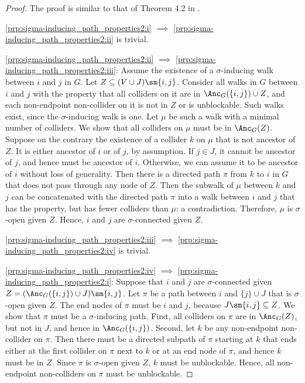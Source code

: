 \begin{proof}
  The proof is similar to that of Theorem 4.2 in \cite{RichardsonSpirtes02}.

  \ref{prp:sigma-inducing_path_properties2:i} $\implies$ \ref{prp:sigma-inducing_path_properties2:ii} is trivial.

  \ref{prp:sigma-inducing_path_properties2:ii} $\implies$ \ref{prp:sigma-inducing_path_properties2:iii}: Assume the existence of a $\sigma$-inducing walk between $i$ and $j$ in $G$. 
  Let $Z \subseteq (V \cup J) \sm\{i,j\}$. 
  Consider all walks in $G$ between $i$ and $j$ with the property that all colliders on it are in $\Anc_{G}({\{i,j\}) \cup Z}$, and each non-endpoint non-collider on it is not in $Z$ or is unblockable.
  Such walks exist, since the $\sigma$-inducing walk is one. 
  Let $\mu$ be such a walk with a minimal number of colliders.
  We show that all colliders on $\mu$ must be in $\Anc_{G}(Z)$. 
  Suppose on the contrary the existence of a collider $k$ on $\mu$ that is not ancestor of $Z$. 
  It is either ancestor of $i$ or of $j$, by assumption.
  If $j \in J$, it cannot be ancestor of $j$, and hence must be ancestor of $i$.
  Otherwise, we can assume it to be ancestor of $i$ without loss of generality.
  Then there is a directed path $\pi$ from $k$ to $i$ in $G$ that does not pass through any node of $Z$. 
  Then the subwalk of $\mu$ between $k$ and $j$ can be concatenated with the directed path $\pi$
  into a walk between $i$ and $j$ that has the property, but has fewer colliders than $\mu$: a contradiction. 
  Therefore, $\mu$ is $\sigma$-open given $Z$.
  Hence, $i$ and $j$ are $\sigma$-connected given $Z$.

  \ref{prp:sigma-inducing_path_properties2:iii} $\implies$ \ref{prp:sigma-inducing_path_properties2:iv} is trivial.

  \ref{prp:sigma-inducing_path_properties2:iv} $\implies$ \ref{prp:sigma-inducing_path_properties2:i}:
  Suppose that %
  $i$ and $j$ are $\sigma$-connected given $Z = (\Anc_{G}(\{i,j\}) \cup J) \sm \{i,j\}$. 
  Let $\pi$ be a path between $i$ and $\{j\} \cup J$ that is $\sigma$-open given $Z$. %
  The end nodes of $\pi$ must be $i$ and $j$, because $J \sm \{i,j\} \subseteq Z$.
  We show that $\pi$ must be a $\sigma$-inducing path. 
  First, all colliders on $\pi$ are in $\Anc_G(Z)$, but not in $J$, and hence in $\Anc_{G}(\{i,j\})$.
  Second, let $k$ be any non-endpoint non-collider on $\pi$.
  Then there must be a directed subpath of $\pi$ starting at $k$ that ends either at the first collider on $\pi$ next to $k$ or at an end node of $\pi$, and hence $k$ must be in $Z$. 
  Since $\pi$ is $\sigma$-open given $Z$, $k$ must be unblockable.
  Hence, all non-endpoint non-colliders on $\pi$ must be unblockable.
\end{proof}
